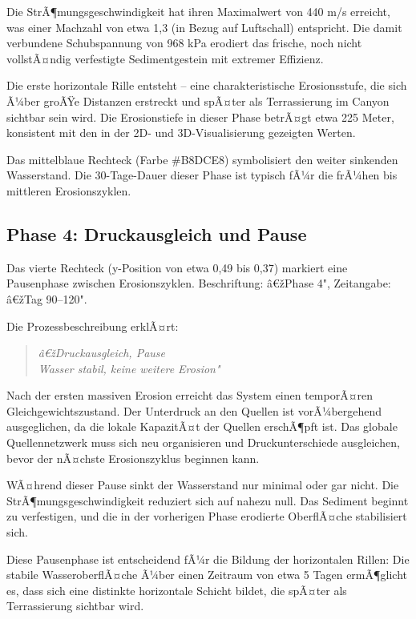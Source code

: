 ﻿\documentclass[12pt,a4paper]{report}
\begin{document}
Die StrÃ¶mungsgeschwindigkeit hat ihren Maximalwert von 440 m/s erreicht, was einer Machzahl von etwa 1,3 (in Bezug auf Luftschall) entspricht. Die damit verbundene Schubspannung von 968 kPa erodiert das frische, noch nicht vollstÃ¤ndig verfestigte Sedimentgestein mit extremer Effizienz.

Die erste horizontale Rille entsteht -- eine charakteristische Erosionsstufe, die sich Ã¼ber groÃŸe Distanzen erstreckt und spÃ¤ter als Terrassierung im Canyon sichtbar sein wird. Die Erosionstiefe in dieser Phase betrÃ¤gt etwa 225 Meter, konsistent mit den in der 2D- und 3D-Visualisierung gezeigten Werten.

Das mittelblaue Rechteck (Farbe \#B8DCE8) symbolisiert den weiter sinkenden Wasserstand. Die 30-Tage-Dauer dieser Phase ist typisch fÃ¼r die frÃ¼hen bis mittleren Erosionszyklen.

\subsection{Phase 4: Druckausgleich und Pause}

Das vierte Rechteck (y-Position von etwa 0,49 bis 0,37) markiert eine Pausenphase zwischen Erosionszyklen. Beschriftung: â€žPhase 4", Zeitangabe: â€žTag 90--120".

Die Prozessbeschreibung erklÃ¤rt:
\begin{quote}
	\textit{â€žDruckausgleich, Pause\\
		Wasser stabil, keine weitere Erosion"}
\end{quote}

Nach der ersten massiven Erosion erreicht das System einen temporÃ¤ren Gleichgewichtszustand. Der Unterdruck an den Quellen ist vorÃ¼bergehend ausgeglichen, da die lokale KapazitÃ¤t der Quellen erschÃ¶pft ist. Das globale Quellennetzwerk muss sich neu organisieren und Druckunterschiede ausgleichen, bevor der nÃ¤chste Erosionszyklus beginnen kann.

WÃ¤hrend dieser Pause sinkt der Wasserstand nur minimal oder gar nicht. Die StrÃ¶\-mungs\-geschwindigkeit reduziert sich auf nahezu null. Das Sediment beginnt zu verfestigen, und die in der vorherigen Phase erodierte OberflÃ¤che stabilisiert sich.

Diese Pausenphase ist entscheidend fÃ¼r die Bildung der horizontalen Rillen: Die stabile WasseroberflÃ¤che Ã¼ber einen Zeitraum von etwa 5 Tagen ermÃ¶glicht es, dass sich eine distinkte horizontale Schicht bildet, die spÃ¤ter als Terrassierung sichtbar wird.
\end{document}

